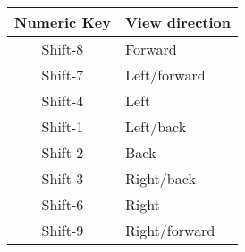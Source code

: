 \begin{tabular}{|c|l|}\hline
 Numeric Key  &  View direction\index{view directions}\\\hline
    Shift-8 & Forward\\
    Shift-7 & Left/forward\\
    Shift-4 & Left\\
    Shift-1 & Left/back\\
    Shift-2 & Back\\
    Shift-3 & Right/back\\
    Shift-6 & Right\\
    Shift-9 & Right/forward\\\hline
\end{tabular}


